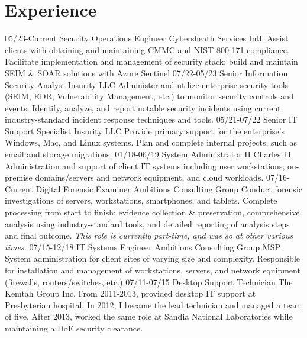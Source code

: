 \documentclass[]{twentysecondcv}
\begin{document}
\section{Experience}
\begin{twenty}
  \twentyitem
    {05/23-Current}
    {Security Operations Engineer}
    {Cybersheath Services Intl.}
    {Assist clients with obtaining and maintaining CMMC and NIST 800-171 compliance.
    Facilitate implementation and management of security stack; build and maintain
    SEIM \& SOAR solutions with Azure Sentinel}
  \twentyitem
    {07/22-05/23}
    {Senior Information Security Analyst}
    {Insurity LLC}
    {Administer and utilize enterprise security tools (SEIM, EDR, Vulnerability
    Management, etc.) to monitor security controls and events. Identify, analyze,
    and report notable security incidents using current industry-standard incident
    response techniques and tools.}
    \twentyitem
    {05/21-07/22}
    {Senior IT Support Specialist}
    {Insurity LLC}
    {Provide primary support for the enterprise's Windows, Mac, and Linux systems.
    Plan and complete internal projects, such as email and storage migrations.}
    \twentyitem
    {01/18-06/19}
    {System Administrator II}
    {Charles IT}
    {Administration and support of client IT systems including  user workstations,
    on-premise domains\slash servers and network equipment, and cloud workloads.}
    \twentyitem
    {07/16-Current}
    {Digital Forensic Examiner}
    {Ambitions Consulting Group}
    {Conduct forensic investigations of servers, workstations, smartphones, and
    tablets. Complete processing from start to finish: evidence collection \& preservation,
    comprehensive analysis using industry-standard tools, and detailed reporting of
    analysis steps and final outcome. \emph{This role is currently part-time, and was so at
    other various times.}}
    \twentyitem
    {07/15-12/18}
    {IT Systems Engineer}
    {Ambitions Consulting Group}
    {MSP System administration for client sites of varying size and complexity. Responsible
    for installation and management of workstations, servers, and network equipment
    (firewalls, routers/switches, etc.)}
    \twentyitem
    {07/11-07/15}
    {Desktop Support Technician}
    {The Kemtah Group Inc.}
    {From 2011-2013, provided desktop IT support at Presbyterian hospital. In 2012,
    I became the lead technician and managed a team of five. After 2013, worked the
    same role at Sandia National Laboratories while maintaining a DoE security clearance.}

\end{twenty}
\end{document}
